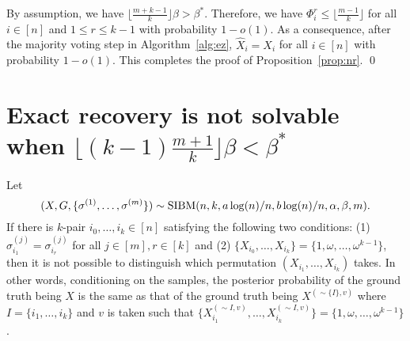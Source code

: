 \documentclass{article}
\begin{document}
By assumption, we have $\lfloor \frac{m+k-1}{k} \rfloor \beta>\beta^\ast$.
Therefore, we have $\Phi^r_i\le \lfloor \frac{m-1}{k} \rfloor$ for all $i\in[n]$ and $1\leq r\leq k-1$ with probability $1-o(1)$.
As a consequence, after the majority voting step in Algorithm~\ref{alg:ez}, $\hat{X}_i=X_i$ for all $i\in[n]$ with probability $1-o(1)$. This completes the proof of Proposition~\ref{prop:nr}.
\hfill\qed
\section{Exact recovery is not solvable when $\lfloor (k-1)\frac{m+1}{k} \rfloor \beta < \beta^\ast$}\label{sect:converse}

\begin{lemma} \label{lm:qq}
	Let 
	$$
	(X,G,\{\sigma^{(1)},\dots,\sigma^{(m)}\})\sim \operatorname{SIBM}(n,k,a\log(n)/n, b\log(n)/n,\alpha,\beta, m) .
	$$
	If there is $k$-pair $i_0,\dots, i_{k}\in[n]$ satisfying the following two conditions: (1) $\sigma_{i_1}^{(j)}=\sigma_{i_r}^{(j)}$ for all $j\in[m], r \in [k] $ and (2) $\{X_{i_0}, \dots, X_{i_{k}}\} = \{1,\omega, \dots, \omega^{k-1} \}$, then it is not possible to distinguish which permutation $(X_{i_1}, \dots, X_{i_k})$ takes. In other words, conditioning on the samples, the posterior probability of the ground truth being $X$ is the same as that of the ground truth being $X^{(\sim\{I\},v)}$ where $I=\{i_1, \dots, i_k\}$ and $v$ is taken such that $\{X^{(\sim I, v)}_{i_1}, \dots, X^{(\sim I,v)}_{i_k}\} = \{1,\omega, \dots, \omega^{k-1} \}$.
\end{lemma}
\end{document}
